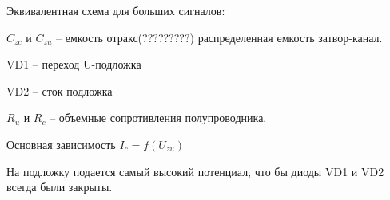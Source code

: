\documentclass[12pt,a4paper]{article}
\begin{document}
Эквивалентная схема для больших сигналов:
\begin{center}
\begin{figure}[h!]
		\label{}
	\end{figure}
\end{center}
$C_{zc}$ и $C_{zu}$ – емкость отракс(?????????) распределенная емкость затвор-канал.

VD1 – переход U-подложка

VD2 – сток подложка

$R_u$ и $R_c$ – объемные сопротивления полупроводника.

Основная зависимость $I_c=f(U_{zu})$
\begin{center}
\begin{figure}[h!]
		\label{}
	\end{figure}
\end{center}

На подложку подается самый высокий потенциал, что бы диоды VD1 и VD2 всегда были закрыты.
\end{document}

